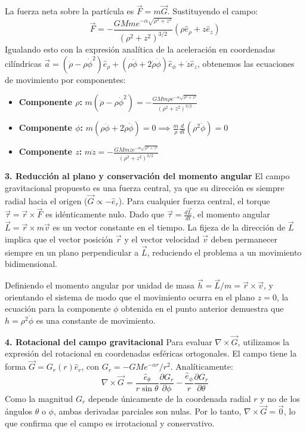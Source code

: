 \documentclass[a4paper]{article}
\begin{document}
La fuerza neta sobre la partícula es $\vec{F} = m\vec{G}$. Sustituyendo el campo:
\begin{equation}
\vec{F} = -\frac{GMm e^{-\alpha \sqrt{\rho^2 + z^2}}}{(\rho^2 + z^2)^{3/2}} (\rho \hat{e}_\rho + z \hat{e}_z)
\end{equation}
Igualando esto con la expresión analítica de la aceleración en coordenadas cilíndricas $\vec{a} = (\ddot{\rho} - \rho\dot{\phi}^2) \hat{e}_\rho + (\rho\ddot{\phi} + 2\dot{\rho}\dot{\phi}) \hat{e}_\phi + \ddot{z} \hat{e}_z$, obtenemos las ecuaciones de movimiento por componentes:
\begin{itemize}
    \item \textbf{Componente $\rho$:} $m(\ddot{\rho} - \rho\dot{\phi}^2) = - \frac{GMm \rho e^{-\alpha \sqrt{\rho^2 + z^2}}}{(\rho^2 + z^2)^{3/2}}$
    \item \textbf{Componente $\phi$:} $m(\rho\ddot{\phi} + 2\dot{\rho}\dot{\phi}) = 0 \implies \frac{m}{\rho} \frac{d}{dt}(\rho^2 \dot{\phi}) = 0$
    \item \textbf{Componente $z$:} $m\ddot{z} = - \frac{GMm z e^{-\alpha \sqrt{\rho^2 + z^2}}}{(\rho^2 + z^2)^{3/2}}$
\end{itemize}

\textbf{3. Reducción al plano y conservación del momento angular}
El campo gravitacional propuesto es una fuerza central, ya que su dirección es siempre radial hacia el origen ($\vec{G} \propto -\hat{e}_r$). Para cualquier fuerza central, el torque $\vec{\tau} = \vec{r} \times \vec{F}$ es idénticamente nulo. Dado que $\vec{\tau} = \frac{d\vec{L}}{dt}$, el momento angular $\vec{L} = \vec{r} \times m\vec{v}$ es un vector constante en el tiempo. La fijeza de la dirección de $\vec{L}$ implica que el vector posición $\vec{r}$ y el vector velocidad $\vec{v}$ deben permanecer siempre en un plano perpendicular a $\vec{L}$, reduciendo el problema a un movimiento bidimensional. 

Definiendo el momento angular por unidad de masa $\vec{h} = \vec{L}/m = \vec{r} \times \vec{v}$, y orientando el sistema de modo que el movimiento ocurra en el plano $z=0$, la ecuación para la componente $\phi$ obtenida en el punto anterior demuestra que $h = \rho^2 \dot{\phi}$ es una constante de movimiento.

\textbf{4. Rotacional del campo gravitacional}
Para evaluar $\nabla \times \vec{G}$, utilizamos la expresión del rotacional en coordenadas esféricas ortogonales. El campo tiene la forma $\vec{G} = G_r(r) \hat{e}_r$, con $G_r = -GM e^{-\alpha r} / r^2$. Analíticamente:
\begin{equation}
\nabla \times \vec{G} = \frac{\hat{e}_\theta}{r \sin \theta} \frac{\partial G_r}{\partial \phi} - \frac{\hat{e}_\phi}{r} \frac{\partial G_r}{\partial \theta}
\end{equation}
Como la magnitud $G_r$ depende únicamente de la coordenada radial $r$ y no de los ángulos $\theta$ o $\phi$, ambas derivadas parciales son nulas. Por lo tanto, $\nabla \times \vec{G} = \vec{0}$, lo que confirma que el campo es irrotacional y conservativo.
\end{document}
